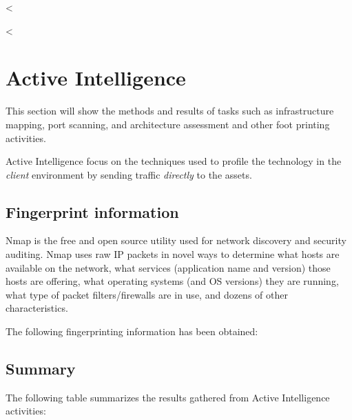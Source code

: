   <%

  <%

  \section {Active Intelligence}\label{sec:activeint}

    This section will show the methods and results of tasks such as
    infrastructure mapping, port scanning, and architecture assessment and other
    foot printing activities.

    Active Intelligence focus on the techniques used to profile the technology
    in the \textit{client} environment by sending traffic \textit{directly} to
    the assets.

    \subsection{Fingerprint information}\label{subsec:activeint-fingerprint}

      Nmap is the free and open source utility used for network discovery and
      security auditing. Nmap uses raw IP packets in novel ways to determine what
      hosts are available on the network, what services (application name and
      version) those hosts are offering, what operating systems (and OS versions)
      they are running, what type of packet filters/firewalls are in use, and
      dozens of other characteristics.

      The following fingerprinting information has been obtained:

      \begin{itemize}
        <%
          \item \textbf{<%
            \begin{verbatim}
<%= port_scan[:result] %>
            \end{verbatim}
        <%
      \end{itemize}

    \subsection{Summary}\label{subsec:activeint-summary}

      The following table summarizes the results gathered from Active
      Intelligence activities:

